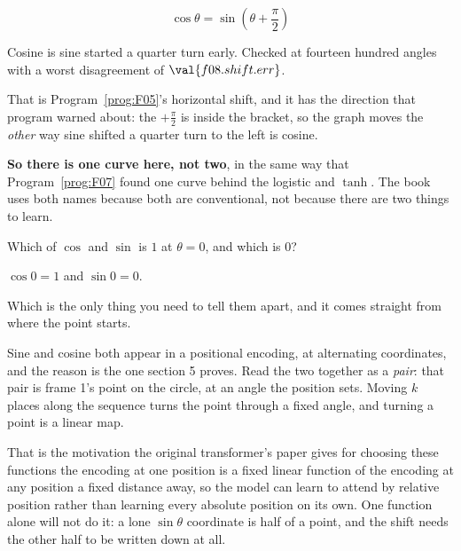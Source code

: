 \begin{fr}
\begin{ansblock}
\[ \cos\theta = \sin\!\left(\theta + \frac{\pi}{2}\right) \]
\end{ansblock}

Cosine is sine started a quarter turn early. Checked at fourteen hundred
angles with a worst disagreement of $\val{f08.shift.err}$.

That is Program~\ref{prog:F05}'s horizontal shift, and it has the direction
that program warned about: the $+\frac{\pi}{2}$ is inside the bracket, so the
graph moves the \emph{other} way \dash{} sine shifted a quarter turn to the
left is cosine.

\textbf{So there is one curve here, not two}, in the same way that
Program~\ref{prog:F07} found one curve behind the logistic and $\tanh$. The
book uses both names because both are conventional, not because there are two
things to learn.

Which of $\cos$ and $\sin$ is $1$ at $\theta = 0$, and which is $0$?
\nextframe
\end{fr}

\begin{fr}
\begin{ansblock}
$\cos 0 = 1$ and $\sin 0 = 0$.
\end{ansblock}

Which is the only thing you need to tell them apart, and it comes straight from
where the point starts.

\begin{aibox}
Sine and cosine both appear in a positional encoding, at alternating
coordinates, and the reason is the one section 5 proves. Read the two together
as a \emph{pair}: that pair is frame 1's point on the circle, at an angle the
position sets. Moving $k$ places along the sequence turns the point through a
fixed angle, and turning a point is a linear map.

That is the motivation the original transformer's paper gives for choosing
these functions \dash{} the encoding at one position is a fixed linear
function of the encoding at any position a fixed distance away, so the model
can learn to attend by relative position rather than learning every absolute
position on its own. One function alone will not do it: a lone
$\sin\theta$ coordinate is half of a point, and the shift needs the other
half to be written down at all.
\end{aibox}
\end{fr}

